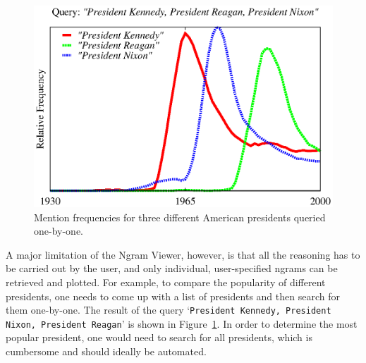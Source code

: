 \documentclass[11pt,a4paper]{article}
\newcommand{\query}[1]{\texttt{#1}}
\begin{document}
\begin{figure}
\includegraphics[width=\columnwidth]{graphs/kenreanixon}
\caption{\label{fig:manual}Mention frequencies for three different American presidents queried one-by-one.}
\end{figure}

A major limitation of the Ngram Viewer, however, is that all the reasoning has to be carried out by the user, and only individual, user-specified ngrams can be retrieved and plotted. For example, to compare the popularity of different presidents, one needs to come up with a list of presidents and then search for them one-by-one. The result of the query `\query{President Kennedy, President Nixon, President Reagan}' is shown in Figure~\ref{fig:manual}. In order to determine the most popular president, one would need to search for all presidents, which is cumbersome and should ideally be automated.
\end{document}
